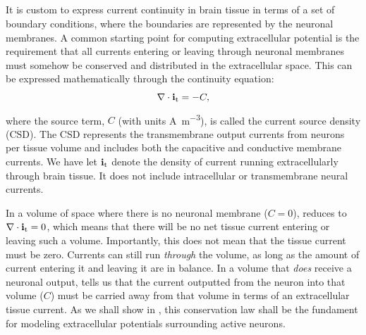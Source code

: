 \subsection{}
\label{sec:Basics:C} 
It is custom to express current continuity in brain tissue in terms of a set of boundary conditions, where the boundaries are represented by the neuronal membranes. A common starting point for computing extracellular potential is the requirement that 
all currents entering or leaving through neuronal membranes must somehow be conserved and distributed in the extracellular space. 
This can be expressed mathematically through the continuity equation:
\begin{equation}
{\bf \nabla} \cdot {\bf i}_\text{t} = -C, 
\label{eq:Basics:continuity1}
\end{equation}
where the source term, $C$ (with units \si{\ampere\per\cubic\metre}), is called the current source density (CSD). The CSD represents the transmembrane output currents from neurons per tissue volume and includes both the capacitive and conductive membrane currents. We have let ${\bf i}_\text{t}$ denote the density of current running extracellularly through brain tissue. It does not include intracellular or transmembrane neural currents. 

In a volume of space where there is no neuronal membrane ($C = 0$),
  reduces to ${\bf \nabla} \cdot {\bf i}_\text{t} = 0$, which means that there will be no net tissue current entering or leaving such a volume. Importantly, this does not mean that the tissue current must be zero. Currents can still run \textit{through} the volume, as long as the amount of current entering it and leaving it are in balance. In a volume that \textit{does} receive a neuronal output,  tells us that the current outputted from the neuron into that volume ($C$) must be carried away from that volume in terms of an extracellular tissue current. As we shall show in , this conservation law shall be the fundament  for modeling extracellular potentials surrounding active neurons.

